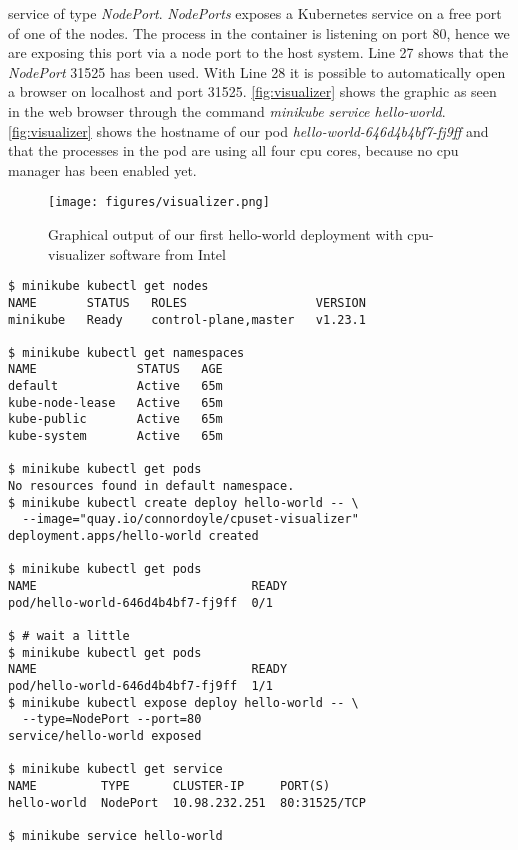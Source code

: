 \documentclass[titlepage]{report}
\begin{document}
service of type \emph{NodePort}. \emph{NodePorts} exposes a Kubernetes service on a free port of one of the nodes. The process in the container is listening on port 80, hence we are exposing this port
via a node port to the host system. Line 27 shows that the \emph{NodePort} 31525 has been used. With Line 28 it is possible to automatically open a browser on localhost and port 31525. \autoref{fig:visualizer}
shows the graphic as seen in the web browser through the command \emph{minikube service hello-world}. \autoref{fig:visualizer} shows the hostname of our pod \emph{hello-world-646d4b4bf7-fj9ff } and that
the processes in the pod are using all four \gls{cpu} cores, because no \gls{cpu} manager has been enabled yet.
\begin{figure}[H]
  \centering
  \texttt{[image: figures/visualizer.png]}
  \caption{Graphical output of our first hello-world deployment with cpu-visualizer software from Intel}\label{fig:visualizer}
\end{figure}
\begin{minipage}{\linewidth}
\begin{lstlisting}[caption={First steps with Minikube (the output has been slightly modified to fit on the page)},label={lst:first_steps_minikube}]
$ minikube kubectl get nodes
NAME       STATUS   ROLES                  VERSION
minikube   Ready    control-plane,master   v1.23.1

$ minikube kubectl get namespaces
NAME              STATUS   AGE
default           Active   65m
kube-node-lease   Active   65m
kube-public       Active   65m
kube-system       Active   65m

$ minikube kubectl get pods
No resources found in default namespace.
$ minikube kubectl create deploy hello-world -- \
  --image="quay.io/connordoyle/cpuset-visualizer"
deployment.apps/hello-world created

$ minikube kubectl get pods
NAME                              READY           
pod/hello-world-646d4b4bf7-fj9ff  0/1  

$ # wait a little
$ minikube kubectl get pods
NAME                              READY 
pod/hello-world-646d4b4bf7-fj9ff  1/1           
$ minikube kubectl expose deploy hello-world -- \
  --type=NodePort --port=80
service/hello-world exposed

$ minikube kubectl get service
NAME         TYPE      CLUSTER-IP     PORT(S)
hello-world  NodePort  10.98.232.251  80:31525/TCP

$ minikube service hello-world
\end{lstlisting}
\end{minipage}
\end{document}
